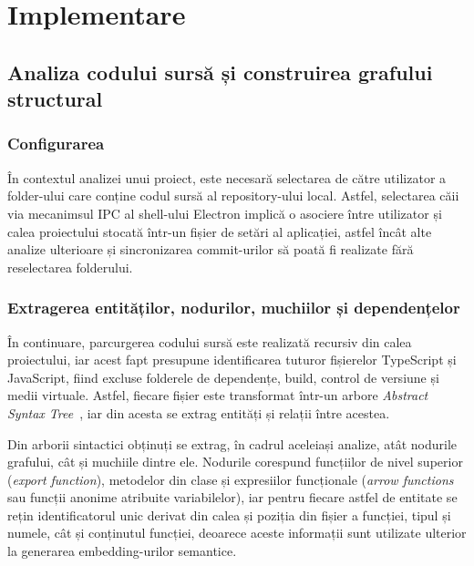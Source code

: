 \documentclass[12pt]{article}
\numberwithin{equation}{section}
\numberwithin{figure}{section}
\numberwithin{table}{section}
\theoremstyle{definition}
\theoremstyle{plain}
\begin{document}
\endgroup

\section{Implementare}

\subsection{Analiza codului sursă și construirea grafului structural}

\subsubsection{Configurarea}

În contextul analizei unui proiect, este necesară selectarea de către utilizator a folder-ului care conține codul sursă al repository-ului local. Astfel, selectarea căii via mecanimsul IPC al shell-ului Electron implică o asociere între utilizator și calea proiectului stocată într-un fișier de setări al aplicației, astfel încât alte analize ulterioare și sincronizarea commit-urilor să poată fi realizate fără reselectarea folderului.

\subsubsection{Extragerea entităților, nodurilor, muchiilor și dependențelor}

În continuare, parcurgerea codului sursă este realizată recursiv din calea proiectului, iar acest fapt presupune identificarea tuturor fișierelor TypeScript și JavaScript, fiind excluse folderele de dependențe, build, control de versiune și medii virtuale.
Astfel, fiecare fișier este transformat într-un arbore \textit{Abstract Syntax Tree}~\cite{aho2006compilers}, iar din acesta se extrag entități și relații între acestea.

Din arborii sintactici obținuți se extrag, în cadrul aceleiași analize, atât nodurile grafului, cât și muchiile dintre ele. Nodurile corespund funcțiilor de nivel superior (\textit{export function}), metodelor din clase și expresiilor funcționale (\textit{arrow functions} sau funcții anonime atribuite variabilelor), iar pentru fiecare astfel de entitate se rețin identificatorul unic derivat din calea și poziția din fișier a funcției, tipul și numele, cât și conținutul funcției, deoarece aceste informații sunt utilizate ulterior la generarea embedding-urilor semantice.
\end{document}
